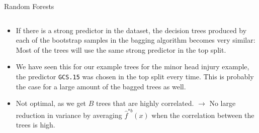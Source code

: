 \documentclass[10pt,ignorenonframetext,]{beamer}
\providecommand{\tightlist}{%
  \setlength{\itemsep}{0pt}\setlength{\parskip}{0pt}}
\begin{document}
\begin{frame}[fragile]{Random Forests}
\protect\hypertarget{random-forests}{}

\(~\)

\begin{itemize}
\tightlist
\item
  If there is a strong predictor in the dataset, the decision trees
  produced by each of the bootstrap samples in the bagging algorithm
  becomes very similar: Most of the trees will use the same strong
  predictor in the top split.
\end{itemize}

\vspace{2mm}

\begin{itemize}
\tightlist
\item
  We have seen this for our example trees for the minor head injury
  example, the predictor \texttt{GCS.15} was chosen in the top split
  every time. This is probably the case for a large amount of the bagged
  trees as well.
\end{itemize}

\vspace{2mm}

\begin{itemize}
\tightlist
\item
  Not optimal, as we get \(B\) trees that are highly correlated.
  \(\rightarrow\) No large reduction in variance by averaging
  \(\hat{f}^{*b}(x)\) when the correlation between the trees is high.
\end{itemize}

\end{frame}
\end{document}
